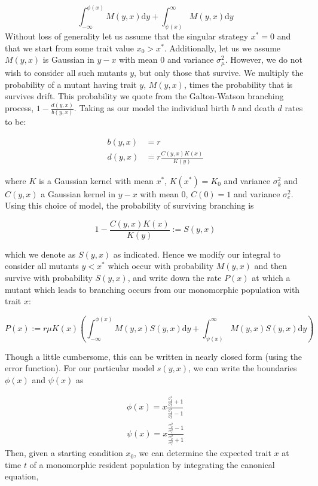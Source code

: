 \documentclass[letterpaper,10pt]{article}
\newcommand{\ud}{\mathrm{d}}
\begin{document}
\begin{equation*}
\int_{-\infty}^{\phi(x)} M(y,x) \ud y + \int_{\psi(x)}^{\infty} M(y,x) \ud y 
\end{equation*}
Without loss of generality let us assume that the singular strategy $x^* = 0$ and that we start from some trait value $x_0 > x^*$.  Additionally, let us we assume $M(y,x)$ is Gaussian in $y-x$ with mean 0 and variance $\sigma_{\mu}^2$. However, we do not wish to consider all such mutants $y$, but only those that survive.  We multiply the probability of a mutant having trait $y$, $M(y,x)$, times the probability that is survives drift.  This probability we quote from the Galton-Watson branching process, $1-\tfrac{d(y,x)}{b(y,x)}$.  Taking as our model the individual birth $b$ and death $d$ rates to be:

\begin{align}
b(y,x) &= r\\
d(y,x) &= r\frac{C(y,x)K(x)}{K(y)}
\end{align}

where $K$ is a Gaussian kernel with mean $x^*$, $K(x^*) = K_0$ and variance $\sigma^2_k$ and $C(y,x)$ a Gaussian kernel in $y-x$ with mean $0$, $C(0) =1$ and variance $\sigma^2_c$. Using this choice of model, the probability of surviving branching is

\begin{equation}
1-\frac{C(y,x)K(x)}{K(y)} := S(y,x)
\label{S}
\end{equation}

which we denote as $S(y,x)$ as indicated. Hence we modify our integral to consider all mutants $y < x^*$ which occur with probability $M(y,x)$ and then survive with probability $S(y,x)$, and write down the rate $P(x)$ at which a mutant which leads to branching occurs from our monomorphic population with trait $x$:

\begin{equation}
P(x) := r \mu K(x)\left( \int_{-\infty}^{\phi(x)} M(y,x) S(y,x) \ud y + \int_{\psi(x)}^{\infty} M(y,x) S(y,x) \ud y  \right)
\label{MSerf}
\end{equation}

Though a little cumbersome, this can be written in nearly closed form (using the error function). For our particular model $s(y,x)$, we can write the boundaries $\phi(x)$ and $\psi(x)$ as 

\begin{align}
\phi(x) = x\frac{\frac{\sigma_k^2}{\sigma_c^2}+1}{\frac{\sigma_k^2}{\sigma_c^2}-1} \nonumber \\
\psi(x) = x\frac{\frac{\sigma_k^2}{\sigma_c^2}-1}{\frac{\sigma_k^2}{\sigma_c^2}+1}
\label{phipsi}
\end{align}
Then, given a starting condition $x_0$, we can determine the expected trait $x$ at time $t$ of a monomorphic resident population by integrating the canonical equation,
\end{document}

